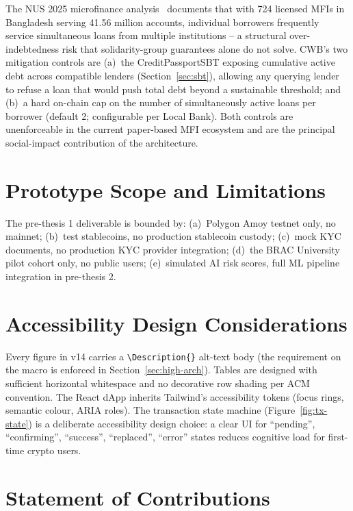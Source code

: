 \documentclass[12pt,a4paper]{report}
\begin{document}
The NUS 2025 microfinance analysis~\cite{nusMicrofinance2025} documents that with 724 licensed MFIs in Bangladesh serving 41.56 million accounts, individual borrowers frequently service simultaneous loans from multiple institutions -- a structural over-indebtedness risk that solidarity-group guarantees alone do not solve. CWB's two mitigation controls are (a)~the CreditPassportSBT exposing cumulative active debt across compatible lenders (Section~\ref{sec:sbt}), allowing any querying lender to refuse a loan that would push total debt beyond a sustainable threshold; and (b)~a hard on-chain cap on the number of simultaneously active loans per borrower (default 2; configurable per Local Bank). Both controls are unenforceable in the current paper-based MFI ecosystem and are the principal social-impact contribution of the architecture.

\section{Prototype Scope and Limitations}
\label{sec:proto-limits}

The pre-thesis 1 deliverable is bounded by: (a)~Polygon Amoy testnet only, no mainnet; (b)~test stablecoins, no production stablecoin custody; (c)~mock KYC documents, no production KYC provider integration; (d)~the BRAC University pilot cohort only, no public users; (e)~simulated AI risk scores, full ML pipeline integration in pre-thesis 2.

\section{Accessibility Design Considerations}
\label{sec:accessibility}

Every figure in v14 carries a \texttt{\textbackslash Description\{\}} alt-text body (the requirement on the macro is enforced in Section~\ref{sec:high-arch}). Tables are designed with sufficient horizontal whitespace and no decorative row shading per ACM convention. The React dApp inherits Tailwind's accessibility tokens (focus rings, semantic colour, ARIA roles). The transaction state machine (Figure~\ref{fig:tx-state}) is a deliberate accessibility design choice: a clear UI for ``pending'', ``confirming'', ``success'', ``replaced'', ``error'' states reduces cognitive load for first-time crypto users.

\section{Statement of Contributions}
\label{sec:contributions}
\end{document}
